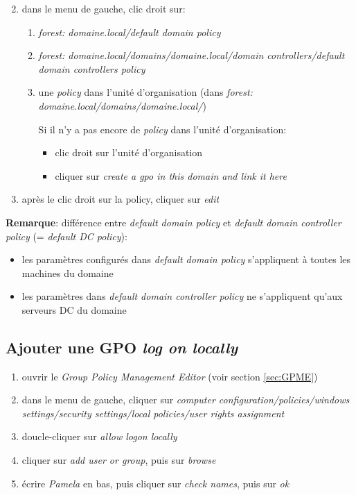 \documentclass[a4paper]{article}
\begin{document}
\begin{enumerate} \setcounter{enumi}{1}
    \item dans le menu de gauche, clic droit sur:
    \begin{enumerate}
        \item \textit{forest: domaine.local/default domain policy}
        \item \textit{forest: domaine.local/domains/domaine.local/domain controllers/default domain controllers policy}
        \item une \textit{policy} dans l'unité d'organisation (dans \textit{forest: domaine.local/domains/domaine.local/})
        \begin{example}
            Si il n'y a pas encore de \textit{policy} dans l'unité d'organisation:
            \begin{itemize}
                \item clic droit sur l'unité d'organisation
                \item cliquer sur \textit{create a gpo in this domain and link it here}
            \end{itemize}
        \end{example}
    \end{enumerate}
    \item après le clic droit sur la policy, cliquer sur \textit{edit}
\end{enumerate}
\textbf{Remarque}: différence entre \textit{default domain policy} et \textit{default domain controller policy} (= \textit{default DC policy}):
\begin{itemize}
    \item les paramètres configurés dans \textit{default domain policy} s'appliquent à toutes les machines du domaine
    \item les paramètres dans \textit{default domain controller policy}  ne s'appliquent qu'aux serveurs DC du domaine
\end{itemize}





\subsection{Ajouter une GPO \textit{log on locally}}



\begin{enumerate}
    \item ouvrir le \textit{Group Policy Management Editor} (voir section \ref{sec:GPME})
    \item dans le menu de gauche, cliquer sur \textit{computer configuration/policies/windows settings/security settings/local policies/user rights assignment}
    \item doucle-cliquer sur \textit{allow logon locally}
    \item cliquer sur \textit{add user or group}, puis sur \textit{browse}
    \item écrire \textit{Pamela} en bas, puis cliquer sur \textit{check names}, puis sur \textit{ok}
\end{enumerate}
\end{document}

